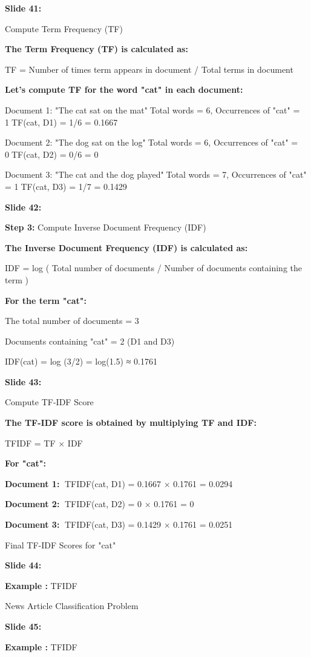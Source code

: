 \documentclass[11pt,a4paper]{article}
\begin{document}
\textbf{Slide 41:}

Compute Term Frequency (TF)

\textbf{The Term Frequency (TF) is calculated as:} 

TF = Number of times term appears in document / Total terms in document

\textbf{Let’s compute TF for the word "cat" in each document:} 

Document 1: "The cat sat on the mat"Total words = 6, Occurrences of "cat" = 1TF(cat, D1) = 1/6 = 0.1667

Document 2: "The dog sat on the log"Total words = 6, Occurrences of "cat" = 0TF(cat, D2) = 0/6 = 0

Document 3: "The cat and the dog played"Total words = 7, Occurrences of "cat" = 1TF(cat, D3) = 1/7 = 0.1429

\textbf{Slide 42:}

\textbf{Step 3:}  Compute Inverse Document Frequency (IDF)

\textbf{The Inverse Document Frequency (IDF) is calculated as:} 

IDF = log ( Total number of documents / Number of documents containing the term )

\textbf{For the term "cat":} 

The total number of documents = 3

Documents containing "cat" = 2 (D1 and D3)

IDF(cat) = log (3/2) = log(1.5) ≈ 0.1761

\textbf{Slide 43:}

Compute TF-IDF Score

\textbf{The TF-IDF score is obtained by multiplying TF and IDF:} 

TFIDF = TF × IDF

\textbf{For "cat":} 

\textbf{Document 1:} TFIDF(cat, D1) = 0.1667 × 0.1761 = 0.0294

\textbf{Document 2:} TFIDF(cat, D2) = 0 × 0.1761 = 0

\textbf{Document 3:} TFIDF(cat, D3) = 0.1429 × 0.1761 = 0.0251

Final TF-IDF Scores for "cat"

\textbf{Slide 44:}

\textbf{Example :} TFIDF

News Article Classification Problem

\textbf{Slide 45:}

\textbf{Example :} TFIDF
\end{document}
